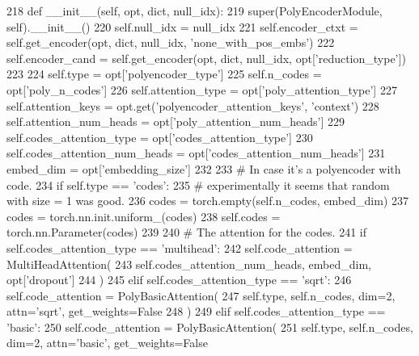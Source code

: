 \begin{DoxyCode}
218     \textcolor{keyword}{def }\_\_init\_\_(self, opt, dict, null\_idx):
219         super(PolyEncoderModule, self).\_\_init\_\_()
220         self.null\_idx = null\_idx
221         self.encoder\_ctxt = self.get\_encoder(opt, dict, null\_idx, \textcolor{stringliteral}{'none\_with\_pos\_embs'})
222         self.encoder\_cand = self.get\_encoder(opt, dict, null\_idx, opt[\textcolor{stringliteral}{'reduction\_type'}])
223 
224         self.type = opt[\textcolor{stringliteral}{'polyencoder\_type'}]
225         self.n\_codes = opt[\textcolor{stringliteral}{'poly\_n\_codes'}]
226         self.attention\_type = opt[\textcolor{stringliteral}{'poly\_attention\_type'}]
227         self.attention\_keys = opt.get(\textcolor{stringliteral}{'polyencoder\_attention\_keys'}, \textcolor{stringliteral}{'context'})
228         self.attention\_num\_heads = opt[\textcolor{stringliteral}{'poly\_attention\_num\_heads'}]
229         self.codes\_attention\_type = opt[\textcolor{stringliteral}{'codes\_attention\_type'}]
230         self.codes\_attention\_num\_heads = opt[\textcolor{stringliteral}{'codes\_attention\_num\_heads'}]
231         embed\_dim = opt[\textcolor{stringliteral}{'embedding\_size'}]
232 
233         \textcolor{comment}{# In case it's a polyencoder with code.}
234         \textcolor{keywordflow}{if} self.type == \textcolor{stringliteral}{'codes'}:
235             \textcolor{comment}{# experimentally it seems that random with size = 1 was good.}
236             codes = torch.empty(self.n\_codes, embed\_dim)
237             codes = torch.nn.init.uniform\_(codes)
238             self.codes = torch.nn.Parameter(codes)
239 
240             \textcolor{comment}{# The attention for the codes.}
241             \textcolor{keywordflow}{if} self.codes\_attention\_type == \textcolor{stringliteral}{'multihead'}:
242                 self.code\_attention = MultiHeadAttention(
243                     self.codes\_attention\_num\_heads, embed\_dim, opt[\textcolor{stringliteral}{'dropout'}]
244                 )
245             \textcolor{keywordflow}{elif} self.codes\_attention\_type == \textcolor{stringliteral}{'sqrt'}:
246                 self.code\_attention = PolyBasicAttention(
247                     self.type, self.n\_codes, dim=2, attn=\textcolor{stringliteral}{'sqrt'}, get\_weights=\textcolor{keyword}{False}
248                 )
249             \textcolor{keywordflow}{elif} self.codes\_attention\_type == \textcolor{stringliteral}{'basic'}:
250                 self.code\_attention = PolyBasicAttention(
251                     self.type, self.n\_codes, dim=2, attn=\textcolor{stringliteral}{'basic'}, get\_weights=\textcolor{keyword}{False}

\end{DoxyCode}
